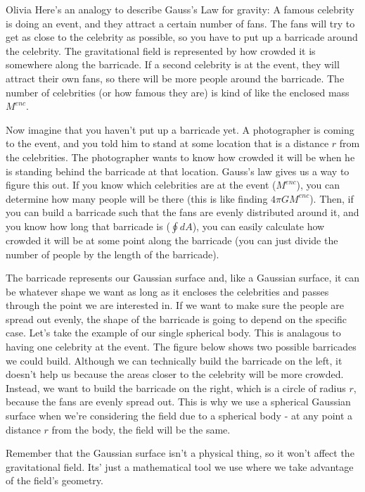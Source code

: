 \begin{studentOpinion}{Olivia} Here's an analogy to describe Gauss's Law for gravity: A famous celebrity is doing an event, and they attract a certain number of fans. The fans will try to get as close to the celebrity as possible, so you have to put up a barricade around the celebrity. The gravitational field is represented by how crowded it is somewhere along the barricade. If a second celebrity is at the event, they will attract their own fans, so there will be more people around the barricade. The number of celebrities (or how famous they are) is kind of like the enclosed mass $M^{enc}$.

Now imagine that you haven't put up a barricade yet. A photographer is coming to the event, and you told him to stand at some location that is a distance $r$ from the celebrities. The photographer wants to know how crowded it will be when he is standing behind the barricade at that location. Gauss's law gives us a way to figure this out. If you know which celebrities are at the event ($M^{enc}$), you can determine how many people will be there (this is like finding $4\pi GM^{enc}$). Then, if you can build a barricade such that the fans are evenly distributed around it, and you know how long that barricade is ($\oint dA$), you can easily calculate how crowded it will be at some point along the barricade (you can just divide the number of people by the length of the barricade). 

The barricade represents our Gaussian surface and, like a Gaussian surface, it can be whatever shape we want as long as it encloses the celebrities and passes through the point we are interested in. If we want to make sure the people are spread out evenly, the shape of the barricade is going to depend on the specific case. Let's take the example of our single spherical body. This is analagous to having one celebrity at the event. The figure below shows two possible barricades we could build. Although we can technically build the barricade on the left, it doesn't help us because the areas closer to the celebrity will be more crowded. Instead, we want to build the barricade on the right, which is a circle of radius $r$, because the fans are evenly spread out. This is why we use a spherical Gaussian surface when we're considering the field due to a spherical body - at any point a distance $r$ from the body, the field will be the same. 


Remember that the Gaussian surface isn't a physical thing, so it won't affect the gravitational field. Its' just a mathematical tool we use where we take advantage of the field's geometry.
\end{studentOpinion}

